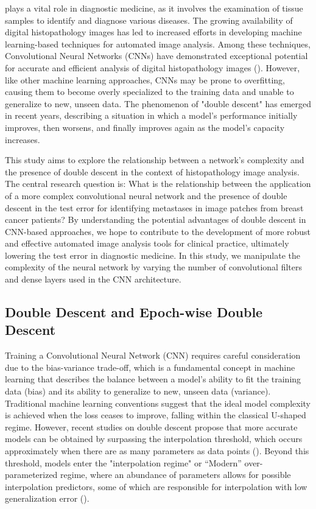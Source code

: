  plays a vital role in diagnostic medicine, as it involves the examination of tissue samples to identify and diagnose various diseases. The growing availability of digital histopathology images has led to increased efforts in developing machine learning-based techniques for automated image analysis. Among these techniques, Convolutional Neural Networks (CNNs) have demonstrated exceptional potential for accurate and efficient analysis of digital histopathology images (\cite{Wemmert2021DeepAnalysis}). However, like other machine learning approaches, CNNs may be prone to overfitting, causing them to become overly specialized to the training data and unable to generalize to new, unseen data. The phenomenon of "double descent" has emerged in recent years, describing a situation in which a model's performance initially improves, then worsens, and finally improves again as the model's capacity increases.

This study aims to explore the relationship between a network's complexity and the presence of double descent in the context of histopathology image analysis. The central research question is: What is the relationship between the application of a more complex convolutional neural network and the presence of double descent in the test error for identifying metastases in image patches from breast cancer patients? By understanding the potential advantages of double descent in CNN-based approaches, we hope to contribute to the development of more robust and effective automated image analysis tools for clinical practice, ultimately lowering the test error in diagnostic medicine. In this study, we manipulate the complexity of the neural network by varying the number of convolutional filters and dense layers used in the CNN architecture.
\subsection{Double Descent and Epoch-wise Double Descent}
Training a Convolutional Neural Network (CNN) requires careful consideration due to the bias-variance trade-off, which is a fundamental concept in machine learning that describes the balance between a model's ability to fit the training data (bias) and its ability to generalize to new, unseen data (variance). Traditional machine learning conventions suggest that the ideal model complexity is achieved when the loss ceases to improve, falling within the classical U-shaped regime. However, recent studies on double descent propose that more accurate models can be obtained by surpassing the interpolation threshold, which occurs approximately when there are as many parameters as data points (\cite{Belkin2019ReconcilingTrade-off}). Beyond this threshold, models enter the "interpolation regime" or “Modern” over-parameterized regime, where an abundance of parameters allows for possible interpolation predictors, some of which are responsible for interpolation with low generalization error (\cite{Belkin2021FitInterpolation}).

